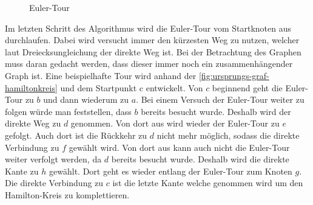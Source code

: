 \documentclass{article}
\begin{document}
\begin{figure}[H]
\centering
{}
\caption{Euler-Tour}
\label{fig:ursprungs-graf-eulertour}
\end{figure}

Im letzten Schritt des Algorithmus wird die Euler-Tour vom Startknoten aus durchlaufen. Dabei wird versucht immer den kürzesten Weg zu nutzen, welcher laut Dreiecksungleichung der direkte Weg ist. Bei der Betrachtung des Graphen muss daran gedacht werden, dass dieser immer noch ein zusammenhängender Graph ist. Eine beispielhafte Tour wird anhand der \autoref{fig:ursprungs-graf-hamiltonkreis} und dem Startpunkt c entwickelt. Von $c$ beginnend geht die Euler-Tour zu $b$ und dann wiederum zu $a$. Bei einem Versuch der Euler-Tour weiter zu folgen würde man feststellen, dass $b$ bereits besucht wurde. Deshalb wird der direkte Weg zu $d$ genommen. Von dort aus wird wieder der Euler-Tour zu $e$ gefolgt. Auch dort ist die Rückkehr zu $d$ nicht mehr möglich, sodass die direkte Verbindung zu $f$ gewählt wird. Von dort aus kann auch nicht die Euler-Tour weiter verfolgt werden, da $d$ bereits besucht wurde. Deshalb wird die direkte Kante zu $h$ gewählt. Dort geht es wieder entlang der Euler-Tour zum Knoten $g$. Die direkte Verbindung zu $c$ ist die letzte Kante welche genommen wird um den Hamilton-Kreis zu komplettieren.
\end{document}
